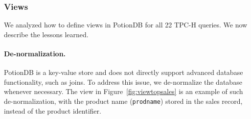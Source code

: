 \documentclass[sigplan,twocolumn,review,anonymous]{acmart}
\newcommand{\nuno}[1]{\nbnote{Nuno}{red}{#1}}
\begin{document}
\subsubsection{Views}
\label{subsec:views_for_queries}

%

We analyzed how to define views in PotionDB for all 22 TPC-H queries.
We now describe the lessons learned. 

\paragraph{De-normalization.} PotionDB is a key-value store and does not directly support advanced database functionality,
such as joins.  To address this issue, we de-normalize the database whenever necessary.  
The view in Figure~\ref{fig:viewtopsales} is an example of such de-normalization, with
the product name (\texttt{prodname}) stored in the sales record, instead of the product identifier.
\end{document}
